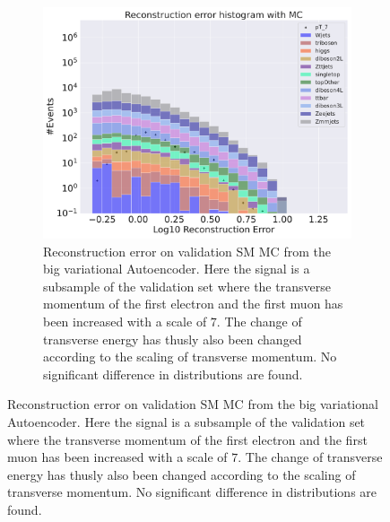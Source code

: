 \begin{figure}[h!]
\begin{subfigure}{.45\textwidth}
        \includegraphics[width=\textwidth]{Figures/VAE_testing/big/b_data_recon_big_rm3_feats_sig_pT_7.pdf}
        \caption{Reconstruction error on validation SM MC from the big variational Autoencoder. Here the signal is a subsample of the validation 
        set where the transverse momentum of the first electron and the first muon has been increased with a scale of $7$. The change of transverse 
        energy has thusly also been changed according to the scaling of transverse momentum. No significant difference in distributions are found. }
        \label{fig:VAE_big_pt_7}
    \end{subfigure}
    \hfill 
    \label{fig:VAE_big_small_pt_7}
\end{figure}

